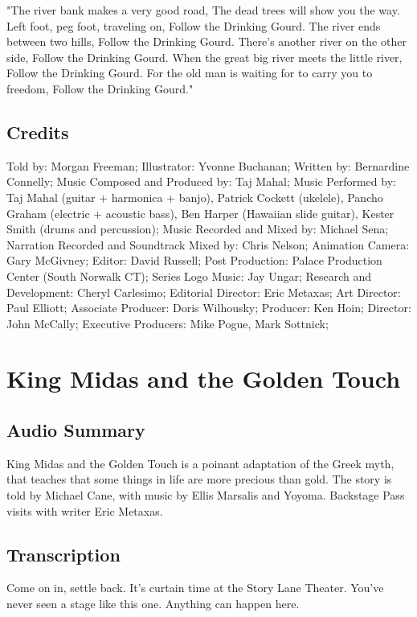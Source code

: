"The river bank makes a very good road,
The dead trees will show you the way.
Left foot, peg foot, traveling on,
Follow the Drinking Gourd.
The river ends between two hills,
Follow the Drinking Gourd.
There's another river on the other side,
Follow the Drinking Gourd.
When the great big river meets the little river,
Follow the Drinking Gourd.
For the old man is waiting for to carry you to freedom,
Follow the Drinking Gourd."

\subsection{Credits}

Told by: Morgan Freeman;
Illustrator: Yvonne Buchanan;
Written by: Bernardine Connelly;
Music Composed and Produced by: Taj Mahal;
Music Performed by: Taj Mahal (guitar + harmonica + banjo), Patrick Cockett (ukelele), Pancho Graham (electric + acoustic bass), Ben Harper (Hawaiian slide guitar), Kester Smith (drums and percussion);
Music Recorded and Mixed by: Michael Sena;
Narration Recorded and Soundtrack Mixed by: Chris Nelson;
Animation Camera: Gary McGivney;
Editor: David Russell;
Post Production: Palace Production Center (South Norwalk CT);
Series Logo Music: Jay Ungar;
Research and Development: Cheryl Carlesimo;
Editorial Director: Eric Metaxas;
Art Director: Paul Elliott;
Associate Producer: Doris Wilhousky;
Producer: Ken Hoin;
Director: John McCally;
Executive Producers: Mike Pogue, Mark Sottnick;

\section{King Midas and the Golden Touch}

\subsection{Audio Summary}

King Midas and the Golden Touch is a poinant adaptation of the Greek myth, that teaches that some things in life are more precious than gold. The story is told by Michael Cane, with music by Ellis Marsalis and Yoyoma. Backstage Pass visits with writer Eric Metaxas.

\subsection{Transcription}

Come on in, settle back. It's curtain time at the Story Lane Theater. You've never seen a stage like this one. Anything can happen here.

